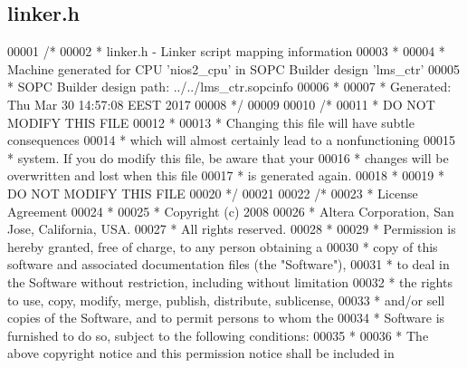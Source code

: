 \subsection{linker.\+h}
\label{linker_8h_source}

\begin{DoxyCode}
00001 \textcolor{comment}{/*}
00002 \textcolor{comment}{ * linker.h - Linker script mapping information}
00003 \textcolor{comment}{ *}
00004 \textcolor{comment}{ * Machine generated for CPU 'nios2\_cpu' in SOPC Builder design 'lms\_ctr'}
00005 \textcolor{comment}{ * SOPC Builder design path: ../../lms\_ctr.sopcinfo}
00006 \textcolor{comment}{ *}
00007 \textcolor{comment}{ * Generated: Thu Mar 30 14:57:08 EEST 2017}
00008 \textcolor{comment}{ */}
00009 
00010 \textcolor{comment}{/*}
00011 \textcolor{comment}{ * DO NOT MODIFY THIS FILE}
00012 \textcolor{comment}{ *}
00013 \textcolor{comment}{ * Changing this file will have subtle consequences}
00014 \textcolor{comment}{ * which will almost certainly lead to a nonfunctioning}
00015 \textcolor{comment}{ * system. If you do modify this file, be aware that your}
00016 \textcolor{comment}{ * changes will be overwritten and lost when this file}
00017 \textcolor{comment}{ * is generated again.}
00018 \textcolor{comment}{ *}
00019 \textcolor{comment}{ * DO NOT MODIFY THIS FILE}
00020 \textcolor{comment}{ */}
00021 
00022 \textcolor{comment}{/*}
00023 \textcolor{comment}{ * License Agreement}
00024 \textcolor{comment}{ *}
00025 \textcolor{comment}{ * Copyright (c) 2008}
00026 \textcolor{comment}{ * Altera Corporation, San Jose, California, USA.}
00027 \textcolor{comment}{ * All rights reserved.}
00028 \textcolor{comment}{ *}
00029 \textcolor{comment}{ * Permission is hereby granted, free of charge, to any person obtaining a}
00030 \textcolor{comment}{ * copy of this software and associated documentation files (the "Software"),}
00031 \textcolor{comment}{ * to deal in the Software without restriction, including without limitation}
00032 \textcolor{comment}{ * the rights to use, copy, modify, merge, publish, distribute, sublicense,}
00033 \textcolor{comment}{ * and/or sell copies of the Software, and to permit persons to whom the}
00034 \textcolor{comment}{ * Software is furnished to do so, subject to the following conditions:}
00035 \textcolor{comment}{ *}
00036 \textcolor{comment}{ * The above copyright notice and this permission notice shall be included in}

\end{DoxyCode}

